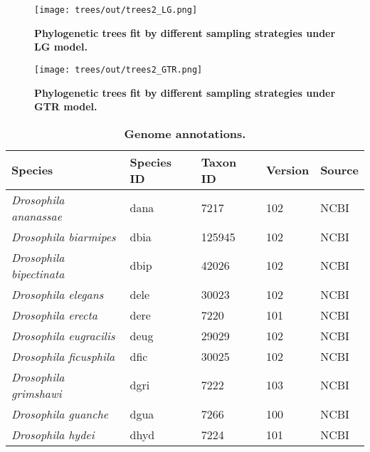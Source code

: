 \begin{figure}[h!]
\texttt{[image: trees/out/trees2\_LG.png]}
\centering
\caption{\textbf{Phylogenetic trees fit by different sampling strategies under LG model.}}
\label{sfig:trees_LG}
\end{figure}

\begin{figure}[h!]
\texttt{[image: trees/out/trees2\_GTR.png]}
\centering
\caption{\textbf{Phylogenetic trees fit by different sampling strategies under GTR model.}}
\label{sfig:trees_GTR}
\end{figure}

\begin{table}[h!]
\centering
\caption{\textbf{Genome annotations.}}
\label{stable:genomes}
\begin{tabular}{|l|l|l|l|l|}
\hline
\textbf{Species}                       & \textbf{Species ID} & \textbf{Taxon ID} & \textbf{Version} & \textbf{Source} \\ \hline
\textit{Drosophila ananassae}          & dana                & 7217              & 102              & NCBI            \\ \hline
\textit{Drosophila biarmipes}          & dbia                & 125945            & 102              & NCBI            \\ \hline
\textit{Drosophila bipectinata}        & dbip                & 42026             & 102              & NCBI            \\ \hline
\textit{Drosophila elegans}            & dele                & 30023             & 102              & NCBI            \\ \hline
\textit{Drosophila erecta}             & dere                & 7220              & 101              & NCBI            \\ \hline
\textit{Drosophila eugracilis}         & deug                & 29029             & 102              & NCBI            \\ \hline
\textit{Drosophila ficusphila}         & dfic                & 30025             & 102              & NCBI            \\ \hline
\textit{Drosophila grimshawi}          & dgri                & 7222              & 103              & NCBI            \\ \hline
\textit{Drosophila guanche}            & dgua                & 7266              & 100              & NCBI            \\ \hline
\textit{Drosophila hydei}              & dhyd                & 7224              & 101              & NCBI            \\ \hline

\end{tabular}
\end{table}
